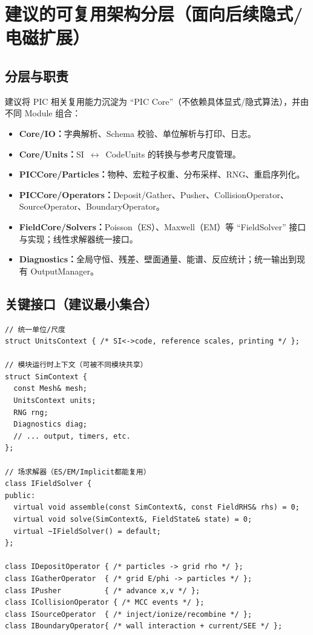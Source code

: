 \documentclass[11pt,a4paper]{ctexart}
\begin{document}
\section{建议的可复用架构分层（面向后续隐式/电磁扩展）}
\subsection{分层与职责}
建议将 PIC 相关复用能力沉淀为 ``PIC Core''（不依赖具体显式/隐式算法），并由不同 Module 组合：
\begin{itemize}[leftmargin=2em]
\item \textbf{Core/IO：}字典解析、Schema 校验、单位解析与打印、日志。
\item \textbf{Core/Units：}SI \,$\leftrightarrow$\, CodeUnits 的转换与参考尺度管理。
\item \textbf{PICCore/Particles：}物种、宏粒子权重、分布采样、RNG、重启序列化。
\item \textbf{PICCore/Operators：}Deposit/Gather、Pusher、CollisionOperator、SourceOperator、BoundaryOperator。
\item \textbf{FieldCore/Solvers：}Poisson（ES）、Maxwell（EM）等 ``FieldSolver'' 接口与实现；线性求解器统一接口。
\item \textbf{Diagnostics：}全局守恒、残差、壁面通量、能谱、反应统计；统一输出到现有 OutputManager。
\end{itemize}

\subsection{关键接口（建议最小集合）}
\begin{lstlisting}
// 统一单位/尺度
struct UnitsContext { /* SI<->code, reference scales, printing */ };

// 模块运行时上下文（可被不同模块共享）
struct SimContext {
  const Mesh& mesh;
  UnitsContext units;
  RNG rng;
  Diagnostics diag;
  // ... output, timers, etc.
};

// 场求解器（ES/EM/Implicit都能复用）
class IFieldSolver {
public:
  virtual void assemble(const SimContext&, const FieldRHS& rhs) = 0;
  virtual void solve(SimContext&, FieldState& state) = 0;
  virtual ~IFieldSolver() = default;
};

class IDepositOperator { /* particles -> grid rho */ };
class IGatherOperator  { /* grid E/phi -> particles */ };
class IPusher          { /* advance x,v */ };
class ICollisionOperator { /* MCC events */ };
class ISourceOperator  { /* inject/ionize/recombine */ };
class IBoundaryOperator{ /* wall interaction + current/SEE */ };
\end{lstlisting}
\end{document}
